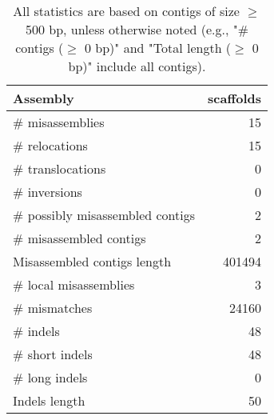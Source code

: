 \documentclass[12pt,a4paper]{article}
\begin{document}
\begin{table}[ht]
\begin{center}
\caption{All statistics are based on contigs of size $\geq$ 500 bp, unless otherwise noted (e.g., "\# contigs ($\geq$ 0 bp)" and "Total length ($\geq$ 0 bp)" include all contigs).}
\begin{tabular}{|l*{1}{|r}|}
\hline
Assembly & scaffolds \\ \hline
\# misassemblies & 15 \\ \hline
\hspace{5mm}\# relocations & 15 \\ \hline
\hspace{5mm}\# translocations & 0 \\ \hline
\hspace{5mm}\# inversions & 0 \\ \hline
\# possibly misassembled contigs & 2 \\ \hline
\# misassembled contigs & 2 \\ \hline
Misassembled contigs length & 401494 \\ \hline
\# local misassemblies & 3 \\ \hline
\# mismatches & 24160 \\ \hline
\# indels & 48 \\ \hline
\hspace{5mm}\# short indels & 48 \\ \hline
\hspace{5mm}\# long indels & 0 \\ \hline
Indels length & 50 \\ \hline
\end{tabular}
\end{center}
\end{table}
\end{document}
